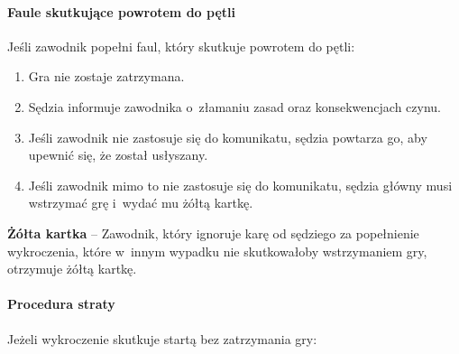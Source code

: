 \documentclass[12pt]{article}
\newcommand\yellowcard[1]{\bgroup\textcolor{darkyellow}{\textbf{#1}}}
\begin{document}
\paragraph{Faule skutkujące powrotem do pętli}
Jeśli zawodnik
popełni faul, który skutkuje powrotem do pętli:

\begin{enumerate}
	\item
	      Gra nie zostaje zatrzymana.
	\item
	      Sędzia informuje zawodnika o~złamaniu zasad oraz konsekwencjach czynu.
	\item
	      Jeśli zawodnik nie zastosuje się do komunikatu, sędzia powtarza go,
	      aby upewnić się, że został usłyszany.
	\item
	      Jeśli zawodnik mimo to nie zastosuje się do komunikatu, sędzia główny
	      musi wstrzymać grę i~wydać mu żółtą kartkę.
\end{enumerate}

\yellowcard{Żółta kartka} -- Zawodnik, który ignoruje karę od sędziego za
popełnienie wykroczenia, które w~innym wypadku nie skutkowałoby
wstrzymaniem gry, otrzymuje żółtą kartkę.

\paragraph{Procedura straty}
Jeżeli wykroczenie skutkuje startą
bez zatrzymania gry:
\end{document}
